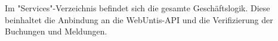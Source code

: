 
Im "Services"-Verzeichnis befindet sich die gesamte Geschäftslogik. Diese beinhaltet die Anbindung an die WebUntis-API und die Verifizierung der Buchungen und Meldungen.